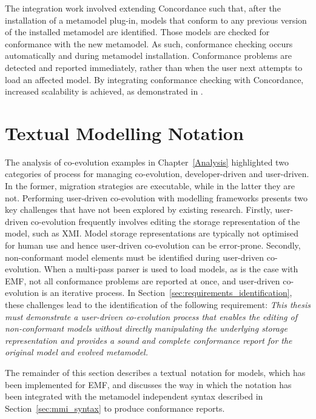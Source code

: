 The integration work involved extending Concordance such that, after the installation of a metamodel plug-in, models that conform to any previous version of the installed metamodel are identified. Those models are checked for conformance with the new metamodel. As such, conformance checking occurs automatically and during metamodel installation. Conformance problems are detected and reported immediately, rather than when the user next attempts to load an affected model. By integrating conformance checking with Concordance, increased scalability is achieved, as demonstrated in \cite{rose10concordance}. 


\section{Textual Modelling Notation}
\label{sec:notation}
The analysis of co-evolution examples in Chapter~\ref{Analysis} highlighted two categories of process for managing co-evolution, developer-driven and user-driven. In the former, migration strategies are executable, while in the latter they are not. Performing user-driven co-evolution with modelling frameworks presents two key challenges that have not been explored by existing research. Firstly, user-driven co-evolution frequently involves editing the storage representation of the model, such as XMI. Model storage representations are typically not optimised for human use and hence user-driven co-evolution can be error-prone. Secondly, non-conformant model elements must be identified during user-driven co-evolution. When a multi-pass parser is used to load models, as is the case with EMF, not all conformance problems are reported at once, and user-driven co-evolution is an iterative process. In Section~\ref{sec:requirements_identification}, these challenges lead to the identification of the following requirement: \emph{This thesis must demonstrate a user-driven co-evolution process that enables the editing of non-conformant models without directly manipulating the underlying storage representation and provides a sound and complete conformance report for the original model and evolved metamodel.}

The remainder of this section describes a textual notation for models, which has been implemented for EMF, and discusses the way in which the notation has been integrated with the metamodel independent syntax described in Section~\ref{sec:mmi_syntax} to produce conformance reports. 


